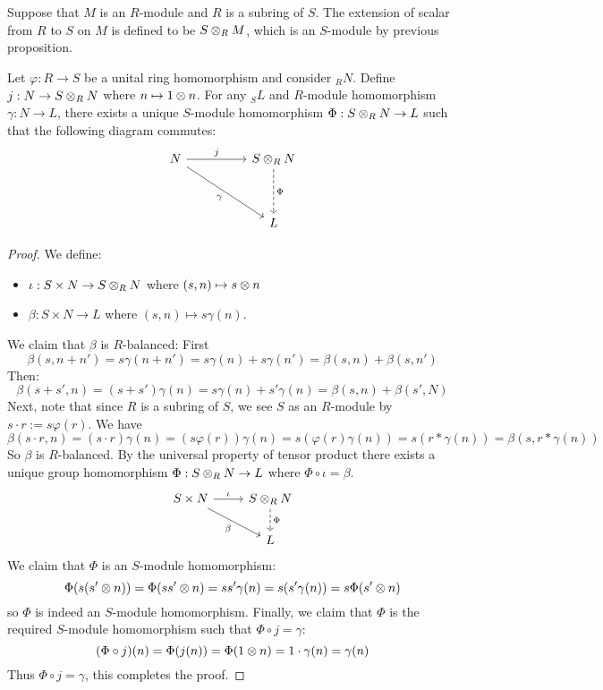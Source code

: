 \begin{defn} 
    Suppose that $M$ is an $R$-module and $R$ is a subring of $S$. The extension of scalar from $R$ to $S$ on $M$ is defined to be $S\otimes_R M$, which is an $S$-module by previous proposition.
\end{defn}

\medskip

\begin{thm}  \label{thm: uni prop ext sca}
     Let $\varphi: R\to S$ be a unital ring homomorphism and consider $_RN$. Define $j:N\to S\otimes_R N$ where $n\mapsto 1\otimes n$. For any $_SL$ and $R$-module homomorphism $\gamma:N\to L$, there exists a unique $S$-module homomorphism $\Phi:S\otimes_R N\to L$ such that the following diagram commutes:
    \[\begin{tikzcd}
	N && {S\ten_R N} \\
	\\
	&& L
	\arrow["j", from=1-1, to=1-3]
	\arrow["\gamma"', from=1-1, to=3-3]
	\arrow["\Phi", dashed, from=1-3, to=3-3]
    \end{tikzcd}\]
\end{thm}
\begin{proof}
	We define:
	\begin{itemize}
		\item $\iota:S\times N \to S\otimes_R N$ where $(s,n)\mapsto s\otimes n$
		\item $\beta:S\times N\to L$ where $(s,n)\mapsto s\gamma(n)$.
	\end{itemize}
	We claim that $\beta$ is $R$-balanced: First
	\[\beta(s,n+n') = s\gamma(n+n') = s\gamma(n) + s\gamma(n') = \beta(s,n) + \beta(s,n')\]
	Then:
	\[\beta(s+s',n) = (s+s')\gamma(n) = s\gamma(n) + s'\gamma(n) = \beta(s,n) + \beta(s',N)\]
	Next, note that since $R$ is a subring of $S$, we see $S$ as an $R$-module by $s\cdot r:= s\varphi(r)$. We have
	\[\beta(s\cdot r, n) = (s\cdot r)\gamma(n) = (s\varphi(r))\gamma(n)=s(\varphi(r)\gamma(n)) = s(r*\gamma(n)) = \beta(s, r*\gamma(n))\]
	So $\beta$ is $R$-balanced. By the universal property of tensor product there exists a unique group homomorphism $\Phi:S\otimes_R N\to L$ where $\Phi\circ \iota = \beta$.
	\[\begin{tikzcd} [sep=small]
	S\times N && {S\ten_R N} \\
	\\
	&& L
	\arrow["\iota", from=1-1, to=1-3]
	\arrow["\beta"', from=1-1, to=3-3]
	\arrow["\Phi", dashed, from=1-3, to=3-3]
    \end{tikzcd}\]
	We claim that $\Phi$ is an $S$-module homomorphism:
	\[\Phi(s(s'\otimes n)) = \Phi(ss'\otimes n) = ss'\gamma(n) = s(s'\gamma(n)) = s\Phi(s'\otimes n)\]
	so $\Phi$ is indeed an $S$-module homomorphism. Finally, we claim that $\Phi$ is the required $S$-module homomorphism such that $\Phi\circ j = \gamma$:
	\[(\Phi\circ j)(n) = \Phi(j(n)) = \Phi(1\otimes n) = 1\cdot \gamma(n) = \gamma(n)\]
	Thus $\Phi\circ j = \gamma$, this completes the proof.
\end{proof}
